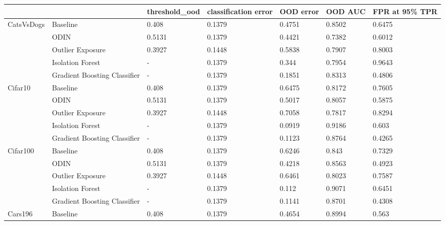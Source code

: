 \begin{tabular}{lllllll}
\toprule
            &                              & threshold\_ood & classification error & OOD error & OOD AUC & FPR at 95\% TPR \\
\midrule
CatsVsDogs & Baseline &         0.408 &               0.1379 &    0.4751 &  0.8502 &         0.6475 \\
            & ODIN &        0.5131 &               0.1379 &    0.4421 &  0.7382 &         0.6012 \\
            & Outlier Exposure &        0.3927 &               0.1448 &    0.5838 &  0.7907 &         0.8003 \\
            & Isolation Forest &             - &               0.1379 &     0.344 &  0.7954 &         0.9643 \\
            & Gradient Boosting Classifier &             - &               0.1379 &    0.1851 &  0.8313 &         0.4806 \\
Cifar10 & Baseline &         0.408 &               0.1379 &    0.6475 &  0.8172 &         0.7605 \\
            & ODIN &        0.5131 &               0.1379 &    0.5017 &  0.8057 &         0.5875 \\
            & Outlier Exposure &        0.3927 &               0.1448 &    0.7058 &  0.7817 &         0.8294 \\
            & Isolation Forest &             - &               0.1379 &    0.0919 &  0.9186 &          0.603 \\
            & Gradient Boosting Classifier &             - &               0.1379 &    0.1123 &  0.8764 &         0.4265 \\
Cifar100 & Baseline &         0.408 &               0.1379 &    0.6246 &   0.843 &         0.7329 \\
            & ODIN &        0.5131 &               0.1379 &    0.4218 &  0.8563 &         0.4923 \\
            & Outlier Exposure &        0.3927 &               0.1448 &    0.6461 &  0.8023 &         0.7587 \\
            & Isolation Forest &             - &               0.1379 &     0.112 &  0.9071 &         0.6451 \\
            & Gradient Boosting Classifier &             - &               0.1379 &    0.1141 &  0.8701 &         0.4308 \\
Cars196 & Baseline &         0.408 &               0.1379 &    0.4654 &  0.8994 &          0.563 \\

\end{tabular}
